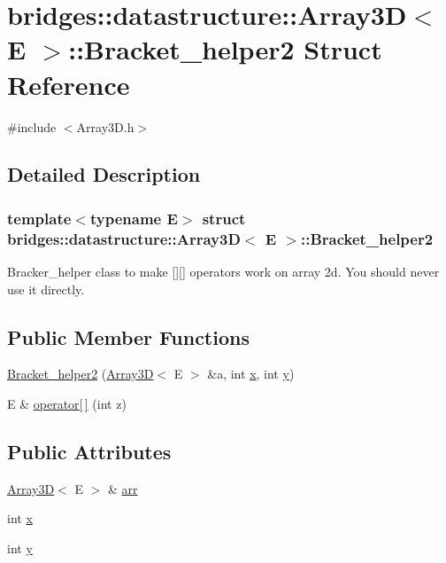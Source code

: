 \hypertarget{structbridges_1_1datastructure_1_1_array3_d_1_1_bracket__helper2}{}\section{bridges\+:\+:datastructure\+:\+:Array3D$<$ E $>$\+:\+:Bracket\+\_\+helper2 Struct Reference}
\label{structbridges_1_1datastructure_1_1_array3_d_1_1_bracket__helper2}


{\ttfamily \#include $<$Array3\+D.\+h$>$}



\subsection{Detailed Description}
\subsubsection*{template$<$typename E$>$\newline
struct bridges\+::datastructure\+::\+Array3\+D$<$ E $>$\+::\+Bracket\+\_\+helper2}

Bracker\+\_\+helper class to make \mbox{[}\mbox{]}\mbox{[}\mbox{]} operators work on array 2d. You should never use it directly. \subsection*{Public Member Functions}
\begin{DoxyCompactItemize}
\item 
\hyperlink{structbridges_1_1datastructure_1_1_array3_d_1_1_bracket__helper2_ac6d8b305dcacc2b1b6d314f2697f78d7}{Bracket\+\_\+helper2} (\hyperlink{classbridges_1_1datastructure_1_1_array3_d}{Array3D}$<$ E $>$ \&a, int \hyperlink{structbridges_1_1datastructure_1_1_array3_d_1_1_bracket__helper2_acd07b57146e72a86ff87e6a00025549a}{x}, int \hyperlink{structbridges_1_1datastructure_1_1_array3_d_1_1_bracket__helper2_a2bd3e3e4253b14e14f1803b49d2f6dca}{y})
\item 
E \& \hyperlink{structbridges_1_1datastructure_1_1_array3_d_1_1_bracket__helper2_a7e8434ee60b6c04571db79bde1b555a4}{operator\mbox{[}$\,$\mbox{]}} (int z)
\end{DoxyCompactItemize}
\subsection*{Public Attributes}
\begin{DoxyCompactItemize}
\item 
\hyperlink{classbridges_1_1datastructure_1_1_array3_d}{Array3D}$<$ E $>$ \& \hyperlink{structbridges_1_1datastructure_1_1_array3_d_1_1_bracket__helper2_a72b1c40a7436cb6f9488ce2fc163ff83}{arr}
\item 
int \hyperlink{structbridges_1_1datastructure_1_1_array3_d_1_1_bracket__helper2_acd07b57146e72a86ff87e6a00025549a}{x}
\item 
int \hyperlink{structbridges_1_1datastructure_1_1_array3_d_1_1_bracket__helper2_a2bd3e3e4253b14e14f1803b49d2f6dca}{y}
\end{DoxyCompactItemize}


